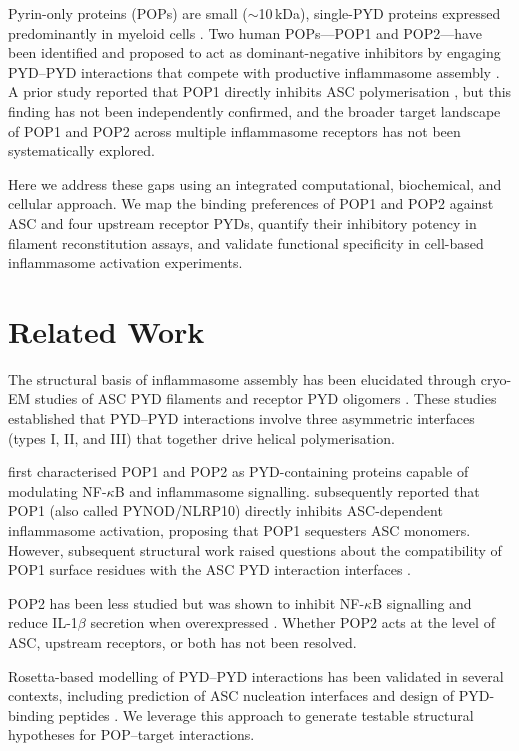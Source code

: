 \documentclass[12pt]{article}
\begin{document}
Pyrin-only proteins (POPs) are small ($\sim$10\,kDa), single-PYD proteins expressed predominantly in myeloid cells \citep{stehlik2007pyrin}. Two human POPs---POP1 and POP2---have been identified and proposed to act as dominant-negative inhibitors by engaging PYD--PYD interactions that compete with productive inflammasome assembly \citep{dorfleutner2015inhibiting}. A prior study reported that POP1 directly inhibits ASC polymerisation \citep{de2007pynod}, but this finding has not been independently confirmed, and the broader target landscape of POP1 and POP2 across multiple inflammasome receptors has not been systematically explored.

Here we address these gaps using an integrated computational, biochemical, and cellular approach. We map the binding preferences of POP1 and POP2 against ASC and four upstream receptor PYDs, quantify their inhibitory potency in filament reconstitution assays, and validate functional specificity in cell-based inflammasome activation experiments.

\section{Related Work}

The structural basis of inflammasome assembly has been elucidated through cryo-EM studies of ASC PYD filaments \citep{lu2014unified} and receptor PYD oligomers \citep{lu2015molecular}. These studies established that PYD--PYD interactions involve three asymmetric interfaces (types I, II, and III) that together drive helical polymerisation.

\citet{stehlik2007pyrin} first characterised POP1 and POP2 as PYD-containing proteins capable of modulating NF-$\kappa$B and inflammasome signalling. \citet{de2007pynod} subsequently reported that POP1 (also called PYNOD/NLRP10) directly inhibits ASC-dependent inflammasome activation, proposing that POP1 sequesters ASC monomers. However, subsequent structural work raised questions about the compatibility of POP1 surface residues with the ASC PYD interaction interfaces \citep{sborgi2015structure}.

POP2 has been less studied but was shown to inhibit NF-$\kappa$B signalling and reduce IL-1$\beta$ secretion when overexpressed \citep{dorfleutner2007pyeloblepharitis}. Whether POP2 acts at the level of ASC, upstream receptors, or both has not been resolved.

Rosetta-based modelling of PYD--PYD interactions has been validated in several contexts, including prediction of ASC nucleation interfaces \citep{de2018mechanism} and design of PYD-binding peptides \citep{franklin2018sensing}. We leverage this approach to generate testable structural hypotheses for POP--target interactions.
\end{document}
